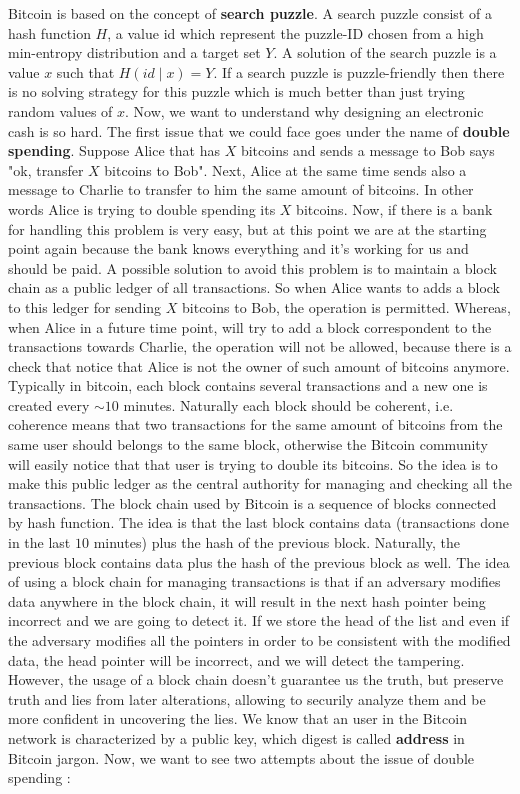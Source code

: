 Bitcoin is based on the concept of \textbf{search puzzle}. A search puzzle consist of a hash function $H$, a value id which represent the puzzle-ID chosen from a high min-entropy distribution and a target set $Y$. A solution of the search puzzle is a value $x$ such that $H(id \mid x) = Y$. If a search puzzle is puzzle-friendly then there is no solving strategy for this puzzle which is much better than just trying random values of $x$. Now, we want to understand why designing an electronic cash is so hard. The first issue that we could face goes under the name of \textbf{double spending}. Suppose Alice that has $X$ bitcoins and sends a message to Bob says "ok, transfer $X$ bitcoins to Bob". Next, Alice at the same time sends also a message to Charlie to transfer to him the same amount of bitcoins. In other words Alice is trying to double spending its $X$ bitcoins. Now, if there is a bank for handling this problem is very easy, but at this point we are at the starting point again because the bank knows everything and it's working for us and should be paid. A possible solution to avoid this problem is to maintain a block chain as a public ledger of all transactions. So when Alice wants to adds a block to this ledger for sending $X$ bitcoins to Bob, the operation is permitted. Whereas, when Alice in a future time point, will try to add a block correspondent to the transactions towards Charlie, the operation will not be allowed, because there is a check that notice that Alice is not the owner of such amount of bitcoins anymore. Typically in bitcoin, each block contains several transactions and a new one is created every $\sim 10$ minutes. Naturally each block should be coherent, i.e. coherence means that two transactions for the same amount of bitcoins from the same user should belongs to the same block, otherwise the Bitcoin community will easily notice that that user is trying to double its bitcoins. So the idea is to make this public ledger as the central authority for managing and checking all the transactions. The block chain used by Bitcoin is a sequence of blocks connected by hash function. The idea is that the last block contains data (transactions done in the last $10$ minutes) plus the hash of the previous block. Naturally, the previous block contains data plus the hash of the previous block as well. The idea of using a block chain for managing transactions is that if an adversary modifies data anywhere in the block chain, it will result in the next hash pointer being incorrect and we are going to detect it. If we store the head of the list and even if the adversary modifies all the pointers in order to be consistent with the modified data, the head pointer will be incorrect, and we will detect the tampering. However, the usage of a block chain doesn't guarantee us the truth, but preserve truth and lies from later alterations, allowing to securily analyze them and be more confident in uncovering the lies. We know that an user in the Bitcoin network is characterized by a public key, which digest is called \textbf{address} in Bitcoin jargon. Now, we want to see two attempts about the issue of double spending :

